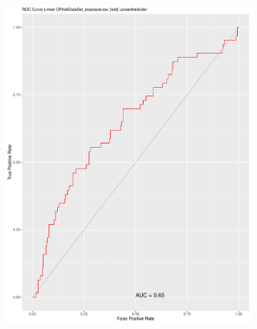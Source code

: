 \documentclass{DissertateUSU}
\begin{document}
\begin{figure}
\centering
\begin{subfigure}[b]{0.5\textwidth}
   \includegraphics[width=1\linewidth]{ROC_Curve_POITesting.pdf}
   \caption{}
   \label{ROC_Validation_dataset} 
\end{subfigure}


\end{figure}
\end{document}
